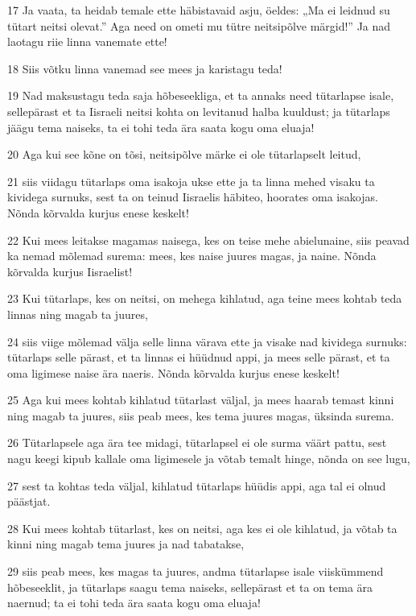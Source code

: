 \par 17 Ja vaata, ta heidab temale ette häbistavaid asju, öeldes: „Ma ei leidnud su tütart neitsi olevat.” Aga need on ometi mu tütre neitsipõlve märgid!” Ja nad laotagu riie linna vanemate ette!
\par 18 Siis võtku linna vanemad see mees ja karistagu teda!
\par 19 Nad maksustagu teda saja hõbeseekliga, et ta annaks need tütarlapse isale, sellepärast et ta Iisraeli neitsi kohta on levitanud halba kuuldust; ja tütarlaps jäägu tema naiseks, ta ei tohi teda ära saata kogu oma eluaja!
\par 20 Aga kui see kõne on tõsi, neitsipõlve märke ei ole tütarlapselt leitud,
\par 21 siis viidagu tütarlaps oma isakoja ukse ette ja ta linna mehed visaku ta kividega surnuks, sest ta on teinud Iisraelis häbiteo, hoorates oma isakojas. Nõnda kõrvalda kurjus enese keskelt!
\par 22 Kui mees leitakse magamas naisega, kes on teise mehe abielunaine, siis peavad ka nemad mõlemad surema: mees, kes naise juures magas, ja naine. Nõnda kõrvalda kurjus Iisraelist!
\par 23 Kui tütarlaps, kes on neitsi, on mehega kihlatud, aga teine mees kohtab teda linnas ning magab ta juures,
\par 24 siis viige mõlemad välja selle linna värava ette ja visake nad kividega surnuks: tütarlaps selle pärast, et ta linnas ei hüüdnud appi, ja mees selle pärast, et ta oma ligimese naise ära naeris. Nõnda kõrvalda kurjus enese keskelt!
\par 25 Aga kui mees kohtab kihlatud tütarlast väljal, ja mees haarab temast kinni ning magab ta juures, siis peab mees, kes tema juures magas, üksinda surema.
\par 26 Tütarlapsele aga ära tee midagi, tütarlapsel ei ole surma väärt pattu, sest nagu keegi kipub kallale oma ligimesele ja võtab temalt hinge, nõnda on see lugu,
\par 27 sest ta kohtas teda väljal, kihlatud tütarlaps hüüdis appi, aga tal ei olnud päästjat.
\par 28 Kui mees kohtab tütarlast, kes on neitsi, aga kes ei ole kihlatud, ja võtab ta kinni ning magab tema juures ja nad tabatakse,
\par 29 siis peab mees, kes magas ta juures, andma tütarlapse isale viiskümmend hõbeseeklit, ja tütarlaps saagu tema naiseks, sellepärast et ta on tema ära naernud; ta ei tohi teda ära saata kogu oma eluaja!

